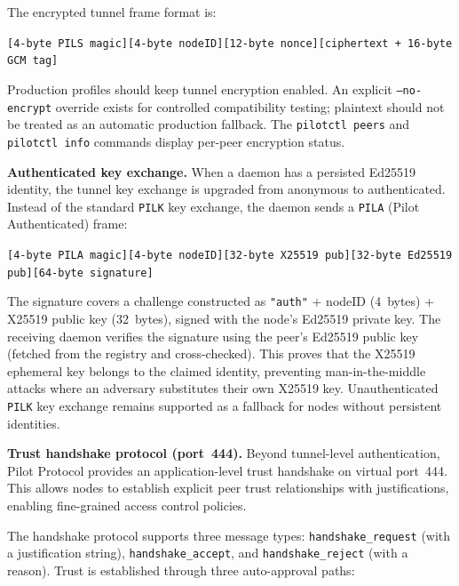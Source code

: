 \documentclass[11pt,a4paper]{article}
\begin{document}
The encrypted tunnel frame format is:

\begin{center}
\texttt{[4-byte PILS magic][4-byte nodeID][12-byte nonce][ciphertext + 16-byte GCM tag]}
\end{center}

Production profiles should keep tunnel encryption enabled. An explicit \texttt{--no-encrypt} override exists for controlled compatibility testing; plaintext should not be treated as an automatic production fallback. The \texttt{pilotctl peers} and \texttt{pilotctl info} commands display per-peer encryption status.

\textbf{Authenticated key exchange.} When a daemon has a persisted Ed25519 identity, the tunnel key exchange is upgraded from anonymous to authenticated. Instead of the standard \texttt{PILK} key exchange, the daemon sends a \texttt{PILA} (Pilot Authenticated) frame:

\begin{center}
\texttt{[4-byte PILA magic][4-byte nodeID][32-byte X25519 pub][32-byte Ed25519 pub][64-byte signature]}
\end{center}

The signature covers a challenge constructed as \texttt{"auth"} + nodeID (4~bytes) + X25519 public key (32~bytes), signed with the node's Ed25519 private key. The receiving daemon verifies the signature using the peer's Ed25519 public key (fetched from the registry and cross-checked). This proves that the X25519 ephemeral key belongs to the claimed identity, preventing man-in-the-middle attacks where an adversary substitutes their own X25519 key. Unauthenticated \texttt{PILK} key exchange remains supported as a fallback for nodes without persistent identities.

\textbf{Trust handshake protocol (port~444).} Beyond tunnel-level authentication, Pilot Protocol provides an application-level trust handshake on virtual port~444. This allows nodes to establish explicit peer trust relationships with justifications, enabling fine-grained access control policies.

The handshake protocol supports three message types: \texttt{handshake\_request} (with a justification string), \texttt{handshake\_accept}, and \texttt{handshake\_reject} (with a reason). Trust is established through three auto-approval paths:
\end{document}
